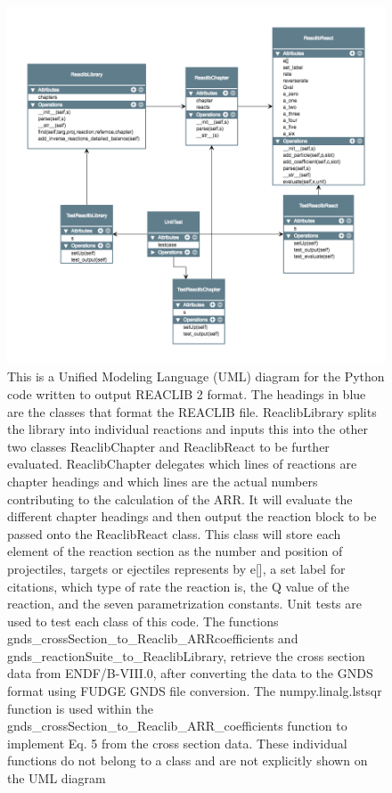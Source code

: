 \documentclass{article}
\begin{document}
\begin{figure}
\includegraphics[width=\linewidth]{UML.png}
 \caption{This is a Unified Modeling Language (UML) diagram for the Python code written to output REACLIB 2 format. The headings in blue are the classes that format the REACLIB file. {\selectfont ReaclibLibrary} splits the library into individual reactions and inputs this into the other two classes {\selectfont ReaclibChapter} and {\selectfont ReaclibReact} to be further evaluated. {\selectfont ReaclibChapter} delegates which lines of reactions are chapter headings and which lines are the actual numbers contributing to the calculation of the ARR.  It will evaluate the different chapter headings and then output the reaction block to be passed onto the {\selectfont ReaclibReact} class. This class will store each element of the reaction section as the number and position of projectiles, targets or ejectiles represents by {\selectfont e[]}, a set label for citations, which type of rate the reaction is, the Q value of the reaction, and the seven parametrization constants. Unit tests are used to test each class of this code. The functions {\selectfont gnds\_crossSection\_to\_Reaclib\_ARRcoefficients} and {\selectfont gnds\_reactionSuite\_to\_ReaclibLibrary}, retrieve the cross section data from ENDF/B-VIII.0, after converting the data to the GNDS format using FUDGE GNDS file conversion. The  {\selectfont numpy.linalg.lstsqr} function is used within the {\selectfont gnds\_crossSection\_to\_Reaclib\_ARR\_coefficients} function to implement Eq. 5 from the cross section data. These individual functions do not belong to a class and are not explicitly shown on the UML diagram}
 \label{Figure 1}
\end{figure}
\end{document}
